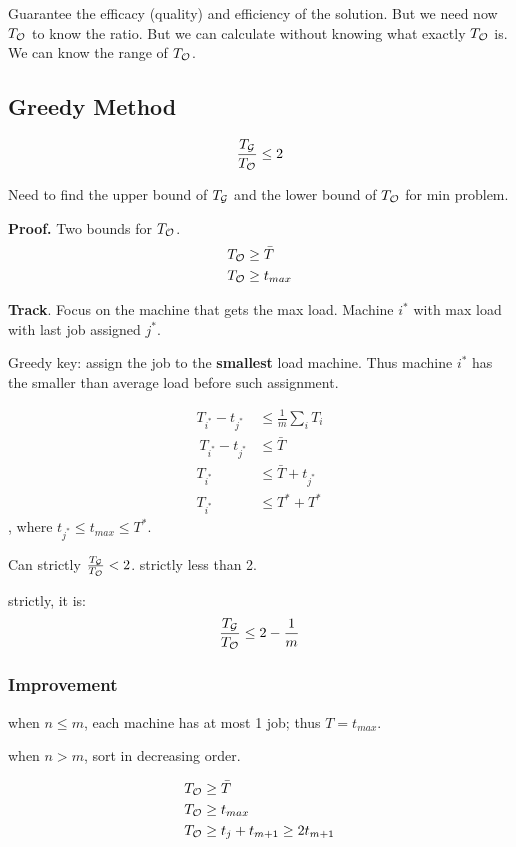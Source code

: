 \documentclass[a4paper]{report}
\theoremstyle{definition}
\begin{document}
Guarantee the efficacy (quality) and efficiency of the solution. But we need now $T_{\mathcal{O}}$ to know the ratio. But we can calculate without knowing what exactly $T_{\mathcal{O}}$ is. We can know the range of $T_{\mathcal{O}}$.

\subsection{Greedy Method}
$$
\frac{T_{\mathcal{G}}}{T_{\mathcal{O}}} \leq 2
$$

Need to find the upper bound of $T_{\mathcal{G}}$ and the lower bound of $T_{\mathcal{O}}$ for min problem.

\textbf{Proof.} Two bounds for $T_{\mathcal{O}}$.
\begin{align}
T_{\mathcal{O}} &\geq \bar T \\
T_{\mathcal{O}} &\geq t_{max}
\end{align}

\textbf{Track}. Focus on the machine that gets the max load. Machine $i^*$ with max load with last job assigned $j^*$.

Greedy key: assign the job to the \textbf{smallest} load machine. Thus machine $i^*$ has the smaller than average load before such assignment.

\begin{align*}
T_{i^*} - t_{j^*} &\leq \frac{1}{m} \sum_{i} T_i\\\
T_{i^*} - t_{j^*} &\leq \bar T \\
T_{i^*} &\leq \bar T + t_{j^*}\\
T_{i^*} &\leq T^* +T^*
\end{align*}
, where $t_{j^*}\leq t_{max}\leq T^*$.

Can strictly $\frac{T_{\mathcal{G}}}{T_{\mathcal{O}}}<2$. strictly less than 2.

strictly, it is:
$$
\frac{T_{\mathcal{G}}}{T_{\mathcal{O}}} \leq 2-\frac{1}{m}
$$

\subsubsection{Improvement}
when $n\leq m$, each machine has at most 1 job; thus $T=t_{max}$.

when $n>m$, sort in decreasing order.

\begin{align*}
& T_{\mathcal{O}} \geq \bar T \\
& T_{\mathcal{O}} \geq t_{max} \\
& T_{\mathcal{O}} \geq t_j + t_{m+1} \geq 2t_{m+1} \\
\end{align*}
\end{document}
